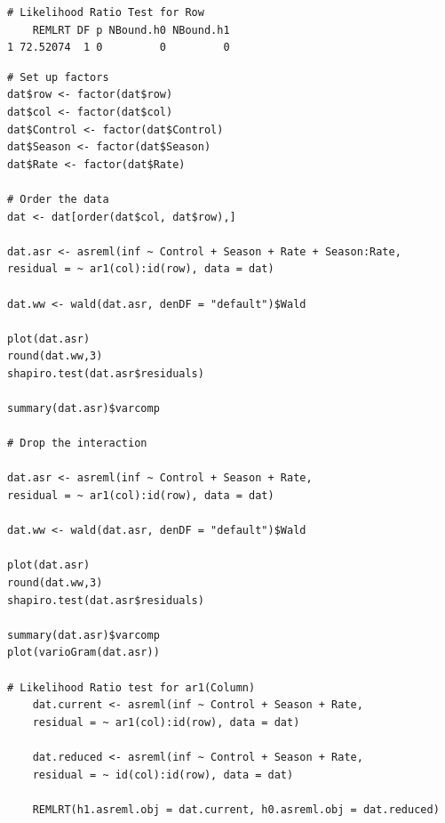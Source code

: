\documentclass[a4paper, 10pt, fleqn, twosided]{memoir}
\begin{document}
\begin{tcolorbox}[title = Exercise 16 output continued]

\begin{verbatim}
# Likelihood Ratio Test for Row
    REMLRT DF p NBound.h0 NBound.h1
1 72.52074  1 0         0         0
\end{verbatim}
\end{tcolorbox}
\clearpage

\begin{tcolorbox}[title = Exercise 17 code]
\begin{verbatim}
# Set up factors
dat$row <- factor(dat$row)
dat$col <- factor(dat$col)
dat$Control <- factor(dat$Control)
dat$Season <- factor(dat$Season)
dat$Rate <- factor(dat$Rate)

# Order the data
dat <- dat[order(dat$col, dat$row),]

dat.asr <- asreml(inf ~ Control + Season + Rate + Season:Rate,
residual = ~ ar1(col):id(row), data = dat)

dat.ww <- wald(dat.asr, denDF = "default")$Wald

plot(dat.asr)
round(dat.ww,3)
shapiro.test(dat.asr$residuals)

summary(dat.asr)$varcomp

# Drop the interaction

dat.asr <- asreml(inf ~ Control + Season + Rate,
residual = ~ ar1(col):id(row), data = dat)

dat.ww <- wald(dat.asr, denDF = "default")$Wald

plot(dat.asr)
round(dat.ww,3)
shapiro.test(dat.asr$residuals)

summary(dat.asr)$varcomp
plot(varioGram(dat.asr))

# Likelihood Ratio test for ar1(Column)
    dat.current <- asreml(inf ~ Control + Season + Rate,
    residual = ~ ar1(col):id(row), data = dat)

    dat.reduced <- asreml(inf ~ Control + Season + Rate,
    residual = ~ id(col):id(row), data = dat)

    REMLRT(h1.asreml.obj = dat.current, h0.asreml.obj = dat.reduced)
\end{verbatim}
\end{tcolorbox}
\end{document}

